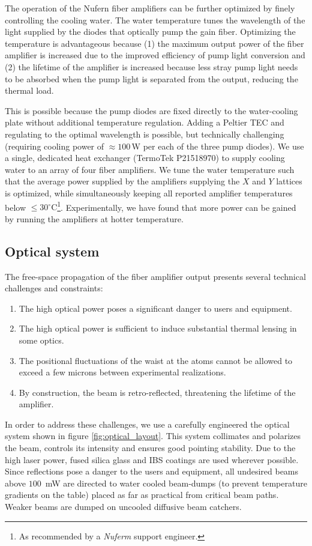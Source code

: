 \documentclass[twocolumn,aps,pra,showpacs,preprintnumbers,bibnotes]{revtex4-1}
\begin{document}
The operation of the Nufern fiber amplifiers can be further optimized by finely controlling the cooling water.
The water temperature tunes the wavelength of the light supplied by the diodes that optically pump the gain fiber.
Optimizing the temperature is advantageous because (1) the maximum output power of the fiber amplifier is increased due to the improved efficiency of pump light conversion and (2) the lifetime of the amplifier is increased because less stray pump light needs to be absorbed when the pump light is separated from the output, reducing the thermal load.

This is possible because the pump diodes are fixed directly to the water-cooling plate without additional temperature regulation.
Adding a Peltier TEC and regulating to the optimal wavelength is possible, but technically challenging (requiring cooling power of $\approx100\,$W per each of the three pump diodes).
We use a single, dedicated heat exchanger (TermoTek P21518970) to supply cooling water to an array of four fiber amplifiers. 
We tune the water temperature such that the average power supplied by the amplifiers supplying the $X$ and $Y$ lattices is optimized, while simultaneously keeping all reported amplifier temperatures below $\leq 30^\circ\mathrm{C}$\footnote{As recommended by a \textit{Nuferm} support engineer.}.
Experimentally, we have found that more power can be gained by running the amplifiers at hotter temperature.

\subsection{Optical system}
The free-space propagation of the fiber amplifier output presents several technical challenges and constraints:
\begin{enumerate}
  \item The high optical power poses a significant danger to users and equipment.
  \item The high optical power is sufficient to induce substantial thermal lensing in some optics. 
  \item The positional fluctuations of the waist at the atoms cannot be allowed to exceed a few microns between experimental realizations.
\item By construction, the beam is retro-reflected, threatening the lifetime of the amplifier. 
  \end{enumerate}

In order to address these challenges, we use a carefully engineered the optical system shown in figure \ref{fig:optical_layout}.
This system collimates and polarizes the beam, controls its intensity and ensures good pointing stability.
Due to the high laser power, fused silica glass and IBS coatings are used wherever possible.
Since reflections pose a danger to the users and equipment, all undesired beams above $100\,$ mW are directed to water cooled beam-dumps (to prevent temperature gradients on the table) placed as far as practical from critical beam paths.
Weaker beams are dumped on uncooled diffusive beam catchers.
\end{document}
